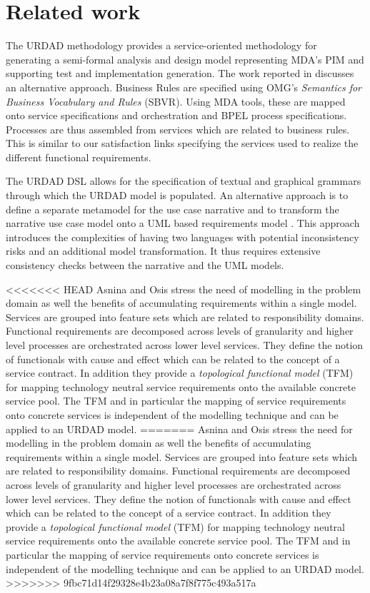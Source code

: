 \section{Related work}
\label{sec:relatedWork}
The URDAD methodology provides a service-oriented methodology for generating a semi-formal analysis and design model representing MDA's PIM and supporting test and implementation generation. The work reported in \cite{iacob_model-driven_2008} discusses an alternative approach. Business Rules are specified using OMG's {\em Semantics for Business Vocabulary and Rules} (SBVR). Using MDA tools, these are mapped onto service specifications and orchestration and BPEL process specifications. Processes are thus assembled from services which are related to business rules. This is similar to our satisfaction links specifying the services used to realize the different functional requirements.

The URDAD DSL allows for the specification of textual and graphical grammars through which the URDAD model is populated. An alternative approach is to define a separate metamodel for the use case narrative and to transform the narrative use case model onto a UML based requirements model \cite{hoffmann_towards_2009,osis_transforming_2010}. This approach introduces the complexities of having two languages with potential inconsistency risks and an additional model transformation. It thus requires extensive consistency checks between the narrative and the UML models.

<<<<<<< HEAD
Asnina and Osis\cite{asnina_computation_2010} stress the need of modelling in the problem domain as well the benefits of accumulating requirements within a single model. Services are grouped into feature sets which are related to responsibility domains. Functional requirements are decomposed across levels of granularity and higher level processes are orchestrated across lower level services. They define the notion of functionals with cause and effect which can be related to the concept of a service contract. In addition they provide a {\em topological functional model} (TFM) for mapping technology neutral service requirements onto the available concrete service pool. The TFM and in particular the mapping of service requirements onto concrete services is independent of the modelling technique and can be applied to an URDAD model. 
=======
Asnina and Osis \cite{asnina_computation_2010} stress the need for modelling in the problem domain as well the benefits of accumulating requirements within a single model. Services are grouped into feature sets which are related to responsibility domains. Functional requirements are decomposed across levels of granularity and higher level processes are orchestrated across lower level services. They define the notion of functionals with cause and effect which can be related to the concept of a service contract. In addition they provide a {\em topological functional model} (TFM) for mapping technology neutral service requirements onto the available concrete service pool. The TFM and in particular the mapping of service requirements onto concrete services is independent of the modelling technique and can be applied to an URDAD model. 
>>>>>>> 9fbc71d14f29328e4b23a08a7f8f775c493a517a

